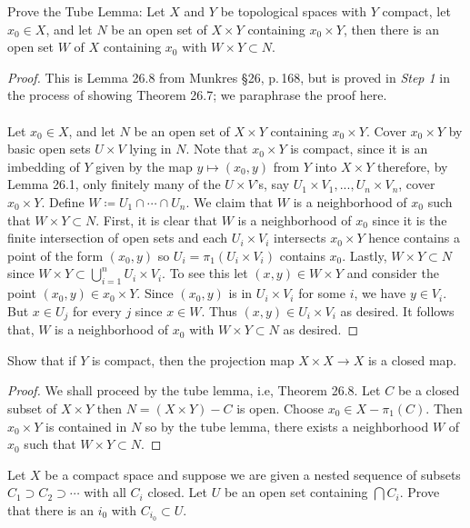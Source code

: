 \begin{problem}
Prove the Tube Lemma: Let $X$ and $Y$ be topological spaces with
$Y$ compact, let $x_0\in X$, and let $N$ be an open set of
$X\times Y$ containing $x_0\times Y$, then there is an open set
$W$ of $X$ containing $x_0$ with $W\times Y\subset
N$.
\end{problem}
\begin{proof}
This is Lemma 26.8 from Munkres \S26, p.\,168, but is proved in \emph{Step
  1} in the process of showing Theorem 26.7; we paraphrase the proof here.
\\\\
Let $x_0\in X$, and let $N$ be an open set of $X\times Y$ containing
$x_0\times Y$. Cover $x_0\times Y$ by basic open sets $U\times V$ lying in
$N$. Note that $x_0\times Y$ is compact, since it is an imbedding of $Y$
given by the map $y\mapsto (x_0,y)$ from $Y$ into $X\times Y$ therefore, by
Lemma 26.1, only finitely many of the $U\times V$'s, say $U_1\times
V_1,...,U_n\times V_n$, cover $x_0\times Y$. Define $W\coloneqq
U_1\cap\cdots\cap U_n$. We claim that $W$ is a neighborhood of $x_0$ such
that $W\times Y\subset N$. First, it is clear that $W$ is a neighborhood of
$x_0$ since it is the finite intersection of open sets and each $U_i\times
V_i$ intersects $x_0\times Y$ hence contains a point of the form $(x_0,y)$
so $U_i=\pi_1(U_i\times V_i)$ contains $x_0$. Lastly, $W\times Y\subset N$
since $W\times Y\subset\bigcup_{i=1}^n U_i\times V_i$. To see this let
$(x,y)\in W\times Y$ and consider the point $(x_0,y)\in x_0\times Y$. Since
$(x_0,y)$ is in $U_i\times V_i$ for some $i$, we have $y\in V_i$. But $x\in
U_j$ for every $j$ since $x\in W$. Thus $(x,y)\in U_i\times V_i$ as
desired. It follows that, $W$ is a neighborhood of $x_0$ with $W\times
Y\subset N$ as desired.
\end{proof}
\begin{problem}
Show that if $Y$ is compact, then the projection map $X\times
X\to X$ is a closed map.
\end{problem}
\begin{proof}
We shall proceed by the tube lemma, i.e, Theorem 26.8. Let $C$ be a closed
subset of $X\times Y$ then $N=(X\times Y)-C$ is open. Choose $x_0\in
X-\pi_1(C)$. Then $x_0\times Y$ is contained in $N$ so by the tube lemma,
there exists a neighborhood $W$ of $x_0$ such that $W\times Y\subset N$.
\end{proof}
\begin{problem}
Let $X$ be a compact space and suppose we are given a nested
sequence of subsets $C_1\supset C_2\supset\cdots$ with all $C_i$
closed. Let $U$ be an open set containing $\bigcap C_i$. Prove
that there is an $i_0$ with $C_{i_0}\subset U$.
\end{problem}
